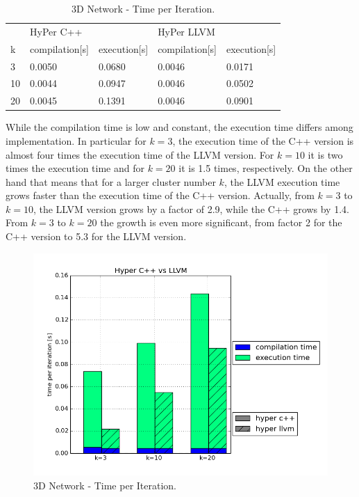 \begin{table}[htsb]
  \caption[3D Network - Time per Iteration]{3D Network - Time per Iteration.}\label{tab:network_serial}
  \centering
  \begin{tabular}{l l l l l}
    \toprule
      & HyPer C++ & & HyPer LLVM & \\
      k & compilation[s] & execution[s] & compilation[s] & execution[s] \\
    \midrule
      3 & 0.0050 & 0.0680 & 0.0046 & 0.0171 \\
      10 & 0.0044 & 0.0947 & 0.0046 & 0.0502 \\
      20 & 0.0045 & 0.1391 & 0.0046 & 0.0901 \\
    \bottomrule
  \end{tabular}
\end{table}



 While the compilation time is low and constant, the execution time differs among implementation. In particular for $k = 3$, the execution time of the C++ version is almost four times the execution time of the LLVM version. For $k = 10$ it is two times the execution time and for $k = 20$ it is 1.5 times, respectively. On the other hand that means that for a larger cluster number $k$, the LLVM execution time grows  faster than the execution time of the C++ version. Actually, from $k = 3$ to $k = 10$, the LLVM version grows by a factor of 2.9, while the C++ grows by 1.4. From $k = 3$ to $k = 20$ the growth is even more significant, from factor 2 for the C++ version to 5.3 for the LLVM version.


\begin{figure}[htsb]
  \centering
  \includegraphics[scale=0.4, trim="0cm 1.5cm 0cm 0cm"]{figures/charts/hyper_network}
  \caption[3D Network - Time per Iteration]{3D Network - Time per Iteration.}
  \label{fig:hyper_network}
\end{figure}

